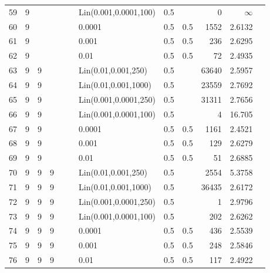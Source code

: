 \begin{longtable}{lrrrrrlrrrrr}
   59 &       9 &   &   &   &   & Lin(0.001,0.0001,100) &  0.5 &        &       0 &               $\infty$ \\
   60 &       9 &   &   &   &   &                0.0001 &  0.5 &    0.5 &    1552 &                 2.6132 \\
   61 &       9 &   &   &   &   &                 0.001 &  0.5 &    0.5 &     236 &                 2.6295 \\
   62 &       9 &   &   &   &   &                  0.01 &  0.5 &    0.5 &      72 &                 2.4935 \\
   63 &       9 & 9 &   &   &   &   Lin(0.01,0.001,250) &  0.5 &        &   63640 &                 2.5957 \\
   64 &       9 & 9 &   &   &   &  Lin(0.01,0.001,1000) &  0.5 &        &   23559 &                 2.7692 \\
   65 &       9 & 9 &   &   &   & Lin(0.001,0.0001,250) &  0.5 &        &   31311 &                 2.7656 \\
   66 &       9 & 9 &   &   &   & Lin(0.001,0.0001,100) &  0.5 &        &       4 &                 16.705 \\
   67 &       9 & 9 &   &   &   &                0.0001 &  0.5 &    0.5 &    1161 &                 2.4521 \\
   68 &       9 & 9 &   &   &   &                 0.001 &  0.5 &    0.5 &     129 &                 2.6279 \\
   69 &       9 & 9 &   &   &   &                  0.01 &  0.5 &    0.5 &      51 &                 2.6885 \\
   70 &       9 & 9 & 9 &   &   &   Lin(0.01,0.001,250) &  0.5 &        &    2554 &                 5.3758 \\
   71 &       9 & 9 & 9 &   &   &  Lin(0.01,0.001,1000) &  0.5 &        &   36435 &                 2.6172 \\
   72 &       9 & 9 & 9 &   &   & Lin(0.001,0.0001,250) &  0.5 &        &       1 &                 2.9796 \\
   73 &       9 & 9 & 9 &   &   & Lin(0.001,0.0001,100) &  0.5 &        &     202 &                 2.6262 \\
   74 &       9 & 9 & 9 &   &   &                0.0001 &  0.5 &    0.5 &     436 &                 2.5539 \\
   75 &       9 & 9 & 9 &   &   &                 0.001 &  0.5 &    0.5 &     248 &                 2.5846 \\
   76 &       9 & 9 & 9 &   &   &                  0.01 &  0.5 &    0.5 &     117 &                 2.4922 \\

\end{longtable}
